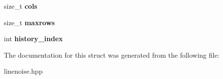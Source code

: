 \begin{DoxyCompactItemize}
\mbox{\label{structlinenoise_1_1linenoise_state_aa7b0149867757ad50f187886215f980b}} 
size\+\_\+t {\bfseries cols}
\item 
\mbox{\label{structlinenoise_1_1linenoise_state_a11a9afbd85b005944077bd00df6d316c}} 
size\+\_\+t {\bfseries maxrows}
\item 
\mbox{\label{structlinenoise_1_1linenoise_state_aceaa1440a7c3b7ee36ad362eecb05b73}} 
int {\bfseries history\+\_\+index}
\end{DoxyCompactItemize}


The documentation for this struct was generated from the following file\+:\begin{DoxyCompactItemize}
\item 
linenoise.\+hpp\end{DoxyCompactItemize}
